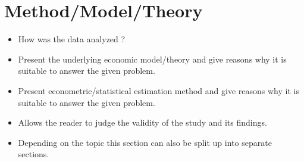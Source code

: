 \section{Method/Model/Theory}\label{Sec:Method}

\begin{itemize}

    \item How was the data analyzed ?

    \item Present the underlying economic model/theory and
        give reasons why it is suitable to answer the given problem.

    \item Present econometric/statistical estimation method and
        give reasons why it is suitable to answer the given problem.

    \item Allows the reader to judge the validity of the study and
        its findings.

    \item Depending on the topic this section can also be split up
        into separate sections.

\end{itemize}
